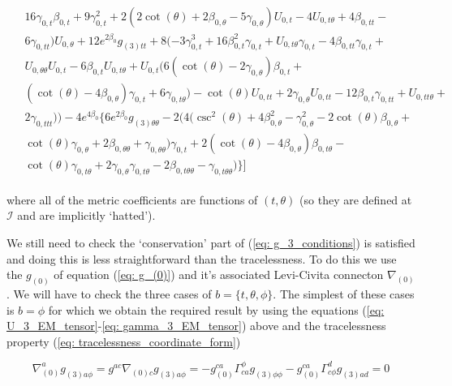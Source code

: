 \documentclass[a4paper,11pt]{article}
\numberwithin{equation}{section}
\begin{document}
\begin{align}
\begin{split}
&16 \gamma_{0, t}  \beta_{0, t} +9 \gamma_{0, t} ^2+2 (2 \cot (\theta )+2 \beta_{0, \theta}-5 \gamma_{0, \theta}) U_{0, t} -4 U_{0, t \theta} +4 \beta_{0, tt}-\\
&6 \gamma_{0, tt}) U_{0, \theta}+12 e^{2 \beta_{0}} g_{(3) t t}+8 (-3 \gamma_{0, t} ^3+16 \beta_{0, t} ^2 \gamma_{0, t} +U_{0, t \theta}  \gamma_{0, t} -4 \beta_{0, tt} \gamma_{0, t} +\\
&U_{0, \theta \theta} U_{0, t} -6 \beta_{0, t}  U_{0, t \theta} +U_{0, t}  (6 (\cot (\theta )-2 \gamma_{0, \theta}) \beta_{0, t} +\\
&(\cot (\theta )-4 \beta_{0, \theta}) \gamma_{0, t} +6 \gamma_{0, t \theta} )-\cot (\theta ) U_{0, tt}+2 \gamma_{0, \theta} U_{0, tt}-12 \beta_{0, t}  \gamma_{0, tt}+U_{0, tt \theta}+\\
&2 \gamma_{0, ttt}))-4 e^{4 \beta_{0}} \{6 e^{2 \beta_{0}} g_{(3) \theta \theta}-2 (4 (\csc ^2(\theta )+4 \beta_{0, \theta}^2-\gamma_{0, \theta}^2-2 \cot (\theta ) \beta_{0, \theta}+\\
&\cot (\theta ) \gamma_{0, \theta}+2 \beta_{0, \theta \theta}+\gamma_{0, \theta \theta}) \gamma_{0, t} +2 (\cot (\theta )-4 \beta_{0, \theta}) \beta_{0, t \theta} -\\
&\cot (\theta ) \gamma_{0, t \theta} +2 \gamma_{0, \theta} \gamma_{0, t \theta} -2 \beta_{0, t \theta \theta}-\gamma_{0, t \theta \theta})\}]
\end{split}
\end{align}

\noindent where all of the metric coefficients are functions of $(t, \theta)$ (so they are defined at $\mathscr{I}$ and are implicitly `hatted'). \par

We still need to check the `conservation' part of (\ref{eq: g_3_conditions}) is satisfied and doing this is less straightforward than the tracelessness. To do this we use the $g_{(0)}$ of equation (\ref{eq: g_(0)}) and it's associated Levi-Civita connecton $\nabla_{(0)}$. We will have to check the three cases of $b=\{ t, \theta, \phi \}$. The simplest of these cases is $b=\phi$ for which we obtain the required result by using the equations (\ref{eq: U_3_EM_tensor}-\ref{eq: gamma_3_EM_tensor}) above and the tracelessness property (\ref{eq: tracelessness_coordinate_form})  

\begin{equation}
\nabla_{(0)}^a g_{(3)a\phi}=g^{ac}\nabla_{(0)c} g_{(3)a\phi}=-g_{(0)}^{ca}\Gamma^{\phi}_{ca}g_{(3)\phi \phi}-g_{(0)}^{ca}\Gamma^{d}_{c \phi}g_{(3) ad }=0
\end{equation}
\end{document}
